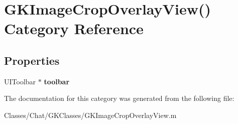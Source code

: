 \hypertarget{category_g_k_image_crop_overlay_view_07_08}{}\section{G\+K\+Image\+Crop\+Overlay\+View() Category Reference}
\label{category_g_k_image_crop_overlay_view_07_08}
\subsection*{Properties}
\begin{DoxyCompactItemize}
\item 
\hypertarget{category_g_k_image_crop_overlay_view_07_08_ac2c7b2942abd93e7c8ebcfa6e4557657}{}U\+I\+Toolbar $\ast$ {\bfseries toolbar}\label{category_g_k_image_crop_overlay_view_07_08_ac2c7b2942abd93e7c8ebcfa6e4557657}

\end{DoxyCompactItemize}


The documentation for this category was generated from the following file\+:\begin{DoxyCompactItemize}
\item 
Classes/\+Chat/\+G\+K\+Classes/G\+K\+Image\+Crop\+Overlay\+View.\+m\end{DoxyCompactItemize}
